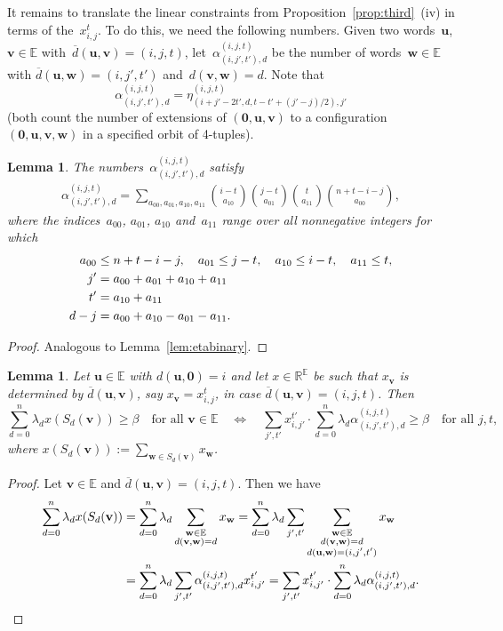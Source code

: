 \documentclass[10pt,a4paper]{article}
\newcommand{\E}{\mathbb{E}}
\newtheorem{lemma}[theorem]{Lemma}
\theoremstyle{definition}
\newcommand{\uu}{\mathbf{u}}
\newcommand{\vv}{\mathbf{v}}
\newcommand{\ww}{\mathbf{w}}
\newcommand{\zero}{\mathbf{0}}
\begin{document}
It remains to translate the linear constraints from Proposition~\ref{prop:third}~(iv) in terms of the~$x_{i,j}^t$. To do this, we need the following numbers.  Given two words~$\uu$, $\vv \in \E$ with~$\overline{d}(\uu,\vv) = (i,j,t)$, let~$\alpha_{(i,j',t'),d}^{(i,j,t)}$ be the number of words~$\ww \in \E$ with $\overline{d}(\uu,\ww)=(i,j',t')$ and~$d(\vv,\ww) =d$. Note that
 \[
 \alpha_{(i,j',t'),d}^{(i,j,t)}=\eta_{(i+j'-2t',d,t-t'+(j'-j)/2),j'}^{(i,j,t)}
 \]
 (both count the number of extensions of $(\zero,\uu,\vv)$ to a configuration $(\zero,\uu,\vv,\ww)$ in a specified orbit of 4-tuples). 
\begin{lemma}\label{lem:alpha}
 The numbers~$\alpha_{(i,j',t'),d}^{(i,j,t)}$ satisfy
\begin{align}
\alpha_{(i,j',t'),d}^{(i,j,t)} =  \sum_{a_{00},a_{01},a_{10},a_{11}} \binom{i-t}{a_{10}} \binom{j-t}{a_{01}} \binom{t}{a_{11}}\binom{n+t-i-j}{a_{00}},
\end{align}
where the indices~$a_{00}$, $a_{01}$, $a_{10}$ and~$a_{11}$ range over all nonnegative integers for which
\begin{align}
a_{00} &\leq n+t-i-j, \quad a_{01} \leq j-t, \quad a_{10} \leq i-t, \quad a_{11} \leq t,\\ 
j' &= a_{00} + a_{01} + a_{10} + a_{11}\notag\\
t'&= a_{10} + a_{11} \notag\\
d-j &=  a_{00} + a_{10} - a_{01} - a_{11}.\notag 
\end{align}
\end{lemma}
\begin{proof}
Analogous to Lemma~\ref{lem:etabinary}. 
\end{proof}


\begin{lemma}\label{lem:lambdas}
Let $\uu \in \E$ with $d(\uu,\zero)=i$ and let $x \in \mathbb{R}^{\E}$ be such that $x_{\vv}$ is determined by $\overline{d}(\uu ,\vv)$, say $x_{\vv}=x_{i,j}^{t}$, in case $\overline{d}(\uu ,\vv)=(i,j,t)$. Then 
\[
\sum_{d=0}^n \lambda_d x(S_d( \vv ))\geq \beta \quad \text{for all $\vv \in\E$} \quad \Longleftrightarrow \quad
\sum_{j',t'} x_{i,j'}^{t'}\cdot \sum_{d=0}^n \lambda_d \alpha_{(i,j',t'),d}^{(i,j,t)} \geq \beta \quad \text{for all $j,t$},
\]
where $x(S_d( \vv )) := \sum_{\ww \in S_d(\vv)} x_{\ww}$.
\end{lemma}
\begin{proof}
Let $\vv \in \E$ and $\overline{d}(\uu,\vv) = (i,j,t)$. Then we have 
\begin{align*}
\sum_{d=0}^n \lambda_d x(S_d(\vv)) & = \sum_{d=0}^n \lambda_d \sum_{\substack{\ww \in\E \\ d(\vv,\ww) = d}} x_{\ww} = \sum_{d=0}^n \lambda_d \sum_{j',t'} \sum_{\substack{\ww \in \E\\d(\vv, \ww)=d \\ d(\uu, \ww)=(i,j',t')}}x_{\ww} \\
&= \sum_{d=0}^n \lambda_d\sum_{j',t'} \alpha_{(i,j',t'),d}^{(i,j,t)} x_{i,j'}^{t'}= \sum_{j',t'} x_{i,j'}^{t'} \cdot \sum_{d=0}^n \lambda_d \alpha_{(i,j',t'),d}^{(i,j,t)}. \qedhere
\end{align*}
\end{proof}
\end{document}
